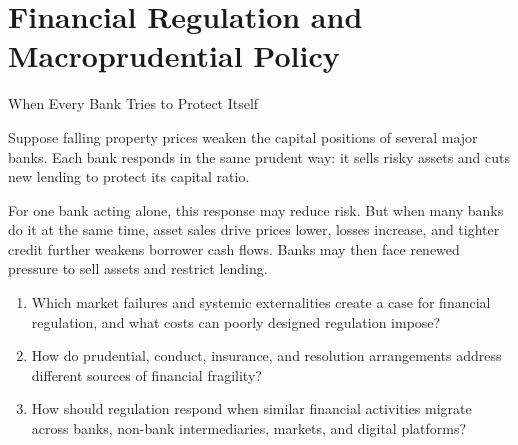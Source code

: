 \chapter{Financial Regulation and Macroprudential Policy}
\label{chap:Financial_Regulation_and_Macroprudential_Policy}

\begin{openingcase}{When Every Bank Tries to Protect Itself}

Suppose falling property prices weaken the capital positions of several major banks. Each bank responds in the same prudent way: it sells risky assets and cuts new lending to protect its capital ratio.

For one bank acting alone, this response may reduce risk. But when many banks do it at the same time, asset sales drive prices lower, losses increase, and tighter credit further weakens borrower cash flows. Banks may then face renewed pressure to sell assets and restrict lending.

\end{openingcase}


\begin{tcolorbox}[
  enhanced,
  colback=FinanceBlue!6,
  colframe=FinanceBlue,
  boxrule=0.6pt,
  sharp corners,
  left=8pt,
  right=8pt,
  top=7pt,
  bottom=7pt,
  before skip=1em,
  after skip=1.6em,
  title=\textbf{Core Questions},
  coltitle=white,
  colbacktitle=FinanceBlue,
  fonttitle=\bfseries,
  attach boxed title to top left={xshift=6pt,yshift=-2mm},
  boxed title style={
    boxrule=0pt,
    sharp corners,
    left=5pt,
    right=5pt,
    top=2pt,
    bottom=2pt
  }
]
\begin{enumerate}[
  leftmargin=*,
  label=\textcolor{FinanceBlue}{\textbf{\arabic*.}},
  itemsep=0.55em,
  topsep=0.2em
]


\item Which market failures and systemic externalities create a case for financial regulation, and what costs can poorly designed regulation impose?

\item How do prudential, conduct, insurance, and resolution arrangements address different sources of financial fragility?

\item How should regulation respond when similar financial activities migrate across banks, non-bank intermediaries, markets, and digital platforms?

\end{enumerate}
\end{tcolorbox}

